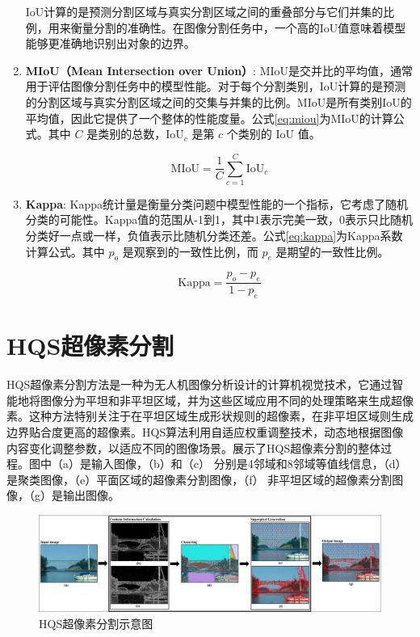 \begin{enumerate}
IoU计算的是预测分割区域与真实分割区域之间的重叠部分与它们并集的比例，用来衡量分割的准确性。在图像分割任务中，一个高的IoU值意味着模型能够更准确地识别出对象的边界。

\item \textbf{MIoU（Mean Intersection over Union）}:
  MIoU是交并比的平均值，通常用于评估图像分割任务中的模型性能。对于每个分割类别，IoU计算的是预测的分割区域与真实分割区域之间的交集与并集的比例。MIoU是所有类别IoU的平均值，因此它提供了一个整体的性能度量。公式\eqref{eq:miou}为MIoU的计算公式。其中 \( C \) 是类别的总数，\( \text{IoU}_c \) 是第 \( c \) 个类别的 IoU 值。

\begin{equation}
  \text{MIoU} = \frac{1}{C} \sum_{c=1}^{C} \text{IoU}_c
  \label{eq:miou}
  \end{equation}

\item \textbf{\textbf{Kappa}}:
  Kappa统计量是衡量分类问题中模型性能的一个指标，它考虑了随机分类的可能性。Kappa值的范围从-1到1，其中1表示完美一致，0表示只比随机分类好一点或一样，负值表示比随机分类还差。公式\eqref{eq:kappa}为Kappa系数计算公式。其中 \( p_o \) 是观察到的一致性比例，而 \( p_e \) 是期望的一致性比例。

  \begin{equation}
    \text{Kappa} = \frac{p_o - p_e}{1 - p_e}
    \label{eq:kappa}
  \end{equation}

\end{enumerate}

\section{HQS超像素分割}

HQS超像素分割方法是一种为无人机图像分析设计的计算机视觉技术，它通过智能地将图像分为平坦和非平坦区域，并为这些区域应用不同的处理策略来生成超像素。这种方法特别关注于在平坦区域生成形状规则的超像素，在非平坦区域则生成边界贴合度更高的超像素。HQS算法利用自适应权重调整技术，动态地根据图像内容变化调整参数，以适应不同的图像场景。展示了HQS超像素分割的整体过程。图中（a）是输入图像，（b）和（c） 分别是4邻域和8邻域等值线信息，（d）是聚类图像，（e）平面区域的超像素分割图像，（f） 非平坦区域的超像素分割图像，（g）是输出图像。

\begin{figure}[htbp]
	\centering
    \includegraphics[width=1.0\textwidth]{pic/hqs.png}
	\caption{HQS超像素分割示意图}
      \label{fig:hqs_pic}
\end{figure}

